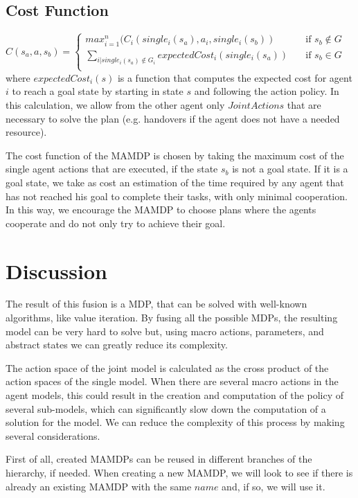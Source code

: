 \subsection{Cost Function}
$C(s_a,a,s_b)= 
	\begin{cases}
		max_{i=1}^{n}(C_i(single_i(s_a),a_i,single_i(s_b))  & \quad \text{if } s_b \not\in G \\
		\sum_{i | single_i(s_a) \not\in G_i} expectedCost_i(single_i(s_a))  & \quad \text{if } s_b \in  G
		\\
	\end{cases} $	\\

where $expectedCost_i(s)$ is a function that computes the expected cost for agent $i$ to reach a goal state by starting in state $s$ and following the action policy. In this calculation, we allow from the other agent only $JointActions$ that are necessary to solve the plan (e.g. handovers if the agent does not have a needed resource).

The cost function of the MAMDP is chosen by taking the maximum cost of the single agent actions that are executed, if the state $s_b$ is not a goal state. If it is a goal state, we take as cost an estimation of the time required by any agent that has not reached his goal to complete their tasks, with only minimal cooperation. In this way, we encourage the MAMDP to choose plans where the agents cooperate and do not only try to achieve their goal.

\section{Discussion}
\label{sec:mamdp-discussion}

The result of this fusion is a MDP, that can be solved with well-known algorithms, like value iteration. By fusing all the possible MDPs, the resulting model can be  very hard to solve but, using macro actions, parameters, and abstract states we can greatly reduce its complexity. 

The action space of the joint model is calculated as the cross product of the action spaces of the single model. When there are several macro actions in the agent models, this could result in the creation and computation of the policy of several sub-models, which can significantly slow down the computation of a solution for the model. We can reduce the complexity of this process by making several considerations.

First of all, created MAMDPs can be reused in different branches of the hierarchy, if needed. When creating a new MAMDP, we will look to see if there is already an existing MAMDP with the same $name$ and, if so, we will use it.


